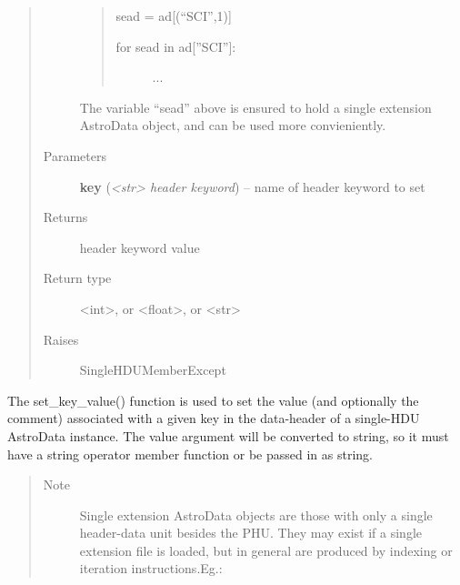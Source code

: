 \documentclass[letterpaper,10pt,english]{sphinxmanual}
\begin{document}
\begin{fulllineitems}
\begin{fulllineitems}
\begin{quote}
\begin{description}
\begin{quote}
sead = ad{[}(``SCI'',1){]}
\begin{description}
\item[{for sead in ad{[}''SCI''{]}:}] \leavevmode
...

\end{description}
\end{quote}

The variable ``sead'' above is ensured to hold a single extension
AstroData object, and can be used more convieniently.

\item[{Parameters}] \leavevmode
\textbf{key} (\emph{\textless{}str\textgreater{} header keyword}) -- name of header keyword to set

\item[{Returns}] \leavevmode
header keyword value

\item[{Return type}] \leavevmode
\textless{}int\textgreater{}, or \textless{}float\textgreater{}, or \textless{}str\textgreater{}

\item[{Raises }] \leavevmode
SingleHDUMemberExcept

\end{description}\end{quote}

\end{fulllineitems}


\begin{fulllineitems}
\label{astro_class:astrodata.AstroData.AstroData.set_key_value}
The set\_key\_value() function is used to set the value (and optionally
the comment) associated with a given key in the data-header of a 
single-HDU AstroData instance. The value argument will be converted to 
string, so it must have a string operator member function or be passed 
in as string.
\begin{quote}\begin{description}
\item[{Note }] \leavevmode
Single extension AstroData objects are those with only a single
header-data unit besides the PHU.  They may exist if a single
extension file is loaded, but in general are produced by indexing 
or iteration instructions.Eg.:
\begin{quote}


\end{quote}
\end{description}
\end{quote}
\end{fulllineitems}
\end{fulllineitems}
\end{document}
